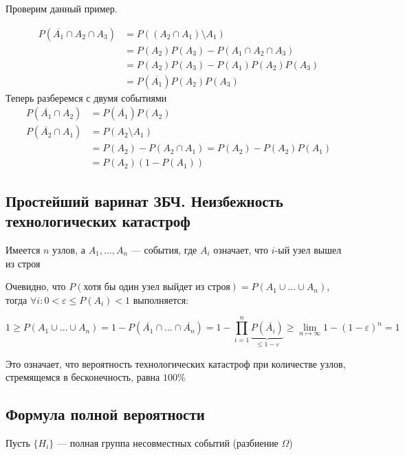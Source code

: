 \documentclass[a4paper, 10pt]{article}
\begin{document}
Проверим данный пример. 

\begin{equation*}
    \begin{aligned}
        P(\overline{A_1}\cap A_2\cap A_3)&=P((A_2\cap A_1)\setminus A_1)\\
        &=P(A_2)P(A_3)-P(A_1\cap A_2\cap A_3)\\
        &=P(A_2)P(A_3)-P(A_1)P(A_2)P(A_3)\\
        &=P(\overline{A_1})P(A_2)P(A_3)
    \end{aligned}
\end{equation*}
Теперь разберемся с двумя событиями
\begin{equation*}
    \begin{aligned}
        P(\overline{A_1}\cap A_2)&=P(\overline{A_1})P(A_2)\\
        P(\overline{A_2}\cap A_1)&=P(A_2\setminus A_1)\\
        &=P(A_2)-P(A_2\cap A_1)=P(A_2)-P(A_2)P(A_1)\\
        &=P(A_2)(1-P(A_1))
    \end{aligned}
\end{equation*}

\subsection{Простейший варинат ЗБЧ. Неизбежность технологических катастроф}
Имеется $n$ узлов, а $A_1,\ldots,A_n$ — события, где $A_i$ означает, что $i$-ый узел вышел из строя

Очевидно, что $P(\text{хотя бы один узел выйдет из строя})=P(A_1\cup \ldots \cup A_n)$, тогда $\forall i: 0<\varepsilon\leqslant P(A_i)<1$ выполняется:

$$1\geqslant P(A_1\cup \ldots \cup A_n)=1-P(\overline{A_1}\cap \ldots\cap\overline{A_n})=1-\displaystyle\prod_{i=1}^{n} \underbrace{P(\overline{A_i})}_{\leqslant 1-\varepsilon}\geqslant \lim\limits_{n\mapsto\infty}1-(1-\varepsilon)^n=1$$

Это означает, что вероятность технологических катастроф при количестве узлов, стремящемся в бесконечность, равна $100\%$
\subsection{Формула полной вероятности}
Пусть $\{H_i\}$ — полная группа несовместных событий (разбиение $\Omega$)
\end{document}
